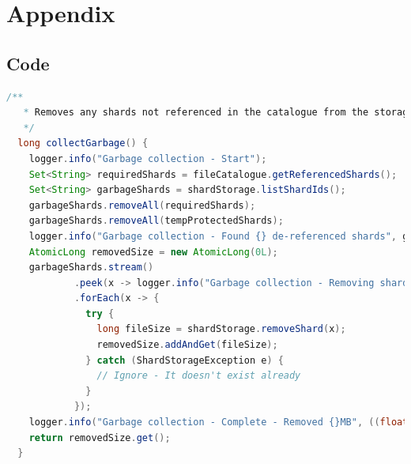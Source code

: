 \documentclass[11pt, a4paper, twoside]{report}
\begin{document}


\newpage

\chapter*{Appendix}

\section{Code}

\begin{lstlisting}[language=Java, caption=Garbage Collection Implementation, label=lst:fileGC]
  /**
   * Removes any shards not referenced in the catalogue from the storage.
   */
  long collectGarbage() {
    logger.info("Garbage collection - Start");
    Set<String> requiredShards = fileCatalogue.getReferencedShards();
    Set<String> garbageShards = shardStorage.listShardIds();
    garbageShards.removeAll(requiredShards);
    garbageShards.removeAll(tempProtectedShards);
    logger.info("Garbage collection - Found {} de-referenced shards", garbageShards.size());
    AtomicLong removedSize = new AtomicLong(0L);
    garbageShards.stream()
            .peek(x -> logger.info("Garbage collection - Removing shard: [{}]", x))
            .forEach(x -> {
              try {
                long fileSize = shardStorage.removeShard(x);
                removedSize.addAndGet(fileSize);
              } catch (ShardStorageException e) {
                // Ignore - It doesn't exist already
              }
            });
    logger.info("Garbage collection - Complete - Removed {}MB", ((float) removedSize.get()) / (1024 * 1024));
    return removedSize.get();
  }
\end{lstlisting}
\end{document}
